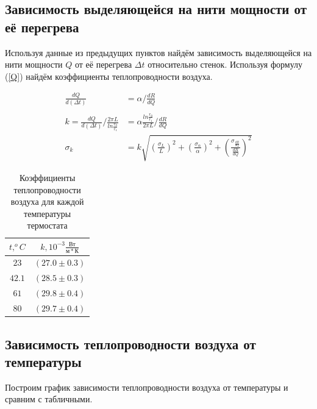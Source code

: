 \documentclass[a4paper, 12pt]{article}
\begin{document}
        \subsection{Зависимость выделяющейся на нити мощности от её перегрева}

            Используя данные из предыдущих пунктов найдём зависимость выделяющейся на нити мощности $Q$ от её перегрева $\Delta t$ относительно стенок. Используя формулу (\ref{Q}) найдём коэффициенты теплопроводности воздуха.

            \begin{align*}
                \frac{dQ}{d(\Delta t)} &= \alpha / \frac{dR}{dQ} \\\\
                k = \frac{dQ}{d(\Delta t)} / \frac{2 \pi L}{ln \frac{r_0}{r_1}} &= \alpha \frac{ln \frac{r_0}{r_1}}{2 \pi L} / \frac{dR}{dQ}\\
                \sigma_k &= k \sqrt{\left( \frac{\sigma_L}{L} \right)^2 + \left( \frac{\sigma_{\alpha}}{\alpha} \right)^2 + \left( \frac{\sigma_{\frac{dR}{dQ}}}{\frac{dR}{dQ}} \right)^2}
            \end{align*}

            \begin{table}[!ht]
                \centering
                \begin{tabular}{|c|c|}
                    \hline

                    $t, ^oC$ & $k, 10^{-3}\frac{Вт}{м * К}$\\ \hline
                    $23$ & $(27.0 \pm 0.3)$\\ \hline
                    $42.1$ & $(28.5 \pm 0.3)$\\ \hline
                    $61$ & $(29.8 \pm 0.4)$\\ \hline
                    $80$ & $(29.7 \pm 0.4)$\\ \hline

                \end{tabular}
                \caption{Коэффициенты теплопроводности воздуха для каждой температуры термостата}
                \label{k_table}
            \end{table}

        \subsection{Зависимость теплопроводности воздуха от температуры}

            Построим график зависимости теплопроводности воздуха от температуры и сравним с табличными.
\end{document}
